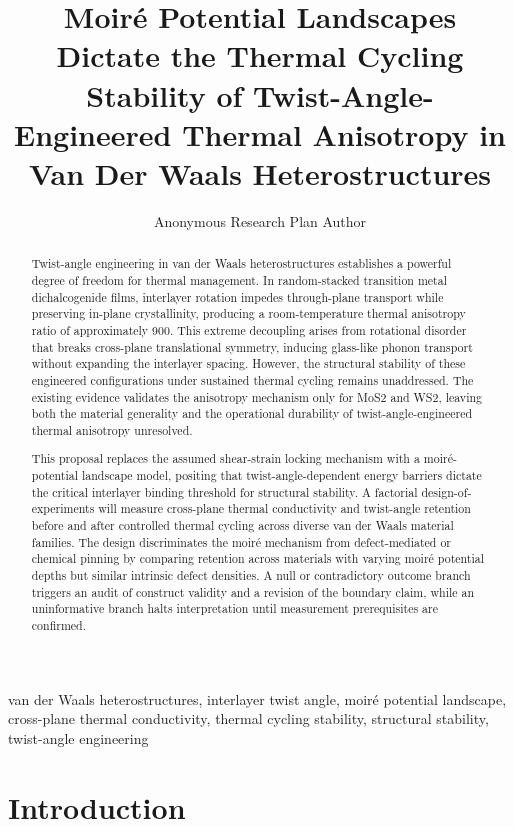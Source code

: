 \documentclass[conference]{IEEEtran}
\begin{document}
\title{Moiré Potential Landscapes Dictate the Thermal Cycling Stability of Twist-Angle-Engineered Thermal Anisotropy in Van Der Waals Heterostructures}\author{Anonymous Research Plan Author}\maketitle

\begin{abstract}
Twist-angle engineering in van der Waals heterostructures establishes a powerful degree of freedom for thermal management. In random-stacked transition metal dichalcogenide films, interlayer rotation impedes through-plane transport while preserving in-plane crystallinity, producing a room-temperature thermal anisotropy ratio of approximately 900. This extreme decoupling arises from rotational disorder that breaks cross-plane translational symmetry, inducing glass-like phonon transport without expanding the interlayer spacing. However, the structural stability of these engineered configurations under sustained thermal cycling remains unaddressed. The existing evidence validates the anisotropy mechanism only for MoS2 and WS2, leaving both the material generality and the operational durability of twist-angle-engineered thermal anisotropy unresolved.

This proposal replaces the assumed shear-strain locking mechanism with a moiré-potential landscape model, positing that twist-angle-dependent energy barriers dictate the critical interlayer binding threshold for structural stability. A factorial design-of-experiments will measure cross-plane thermal conductivity and twist-angle retention before and after controlled thermal cycling across diverse van der Waals material families. The design discriminates the moiré mechanism from defect-mediated or chemical pinning by comparing retention across materials with varying moiré potential depths but similar intrinsic defect densities. A null or contradictory outcome branch triggers an audit of construct validity and a revision of the boundary claim, while an uninformative branch halts interpretation until measurement prerequisites are confirmed.
\end{abstract}
\begin{IEEEkeywords}
van der Waals heterostructures, interlayer twist angle, moiré potential landscape, cross-plane thermal conductivity, thermal cycling stability, structural stability, twist-angle engineering
\end{IEEEkeywords}\section{Introduction}
\end{document}
